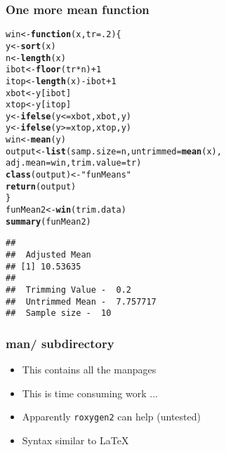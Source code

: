 \documentclass[xcolor=svgnames]{beamer}\usepackage[]{graphicx}\usepackage[]{color}
\makeatletter
\newcommand{\hlnum}[1]{\textcolor[rgb]{0.686,0.059,0.569}{#1}}%
\newcommand{\hlstr}[1]{\textcolor[rgb]{0.192,0.494,0.8}{#1}}%
\newcommand{\hlopt}[1]{\textcolor[rgb]{0,0,0}{#1}}%
\newcommand{\hlstd}[1]{\textcolor[rgb]{0.345,0.345,0.345}{#1}}%
\newcommand{\hlkwa}[1]{\textcolor[rgb]{0.161,0.373,0.58}{\textbf{#1}}}%
\newcommand{\hlkwb}[1]{\textcolor[rgb]{0.69,0.353,0.396}{#1}}%
\newcommand{\hlkwc}[1]{\textcolor[rgb]{0.333,0.667,0.333}{#1}}%
\newcommand{\hlkwd}[1]{\textcolor[rgb]{0.737,0.353,0.396}{\textbf{#1}}}%
\newenvironment{kframe}{%
 \def\at@end@of@kframe{}%
 \ifinner\ifhmode%
  \def\at@end@of@kframe{\end{minipage}}%
  \begin{minipage}{\columnwidth}%
 \fi\fi%
 \def\FrameCommand##1{\hskip\@totalleftmargin \hskip-\fboxsep
 \colorbox{shadecolor}{##1}\hskip-\fboxsep
     \hskip-\linewidth \hskip-\@totalleftmargin \hskip\columnwidth}%
 \MakeFramed {\advance\hsize-\width
   \@totalleftmargin\z@ \linewidth\hsize
   \@setminipage}}%
 {\par\unskip\endMakeFramed%
 \at@end@of@kframe}
\newenvironment{knitrout}{}{} %
\makeatother
\begin{document}
\begin{frame}[fragile]
\frametitle{One more mean function}
\begin{scriptsize}
\begin{knitrout}
\color{fgcolor}\begin{kframe}
\begin{alltt}
\hlstd{win}\hlkwb{<-}\hlkwa{function}\hlstd{(}\hlkwc{x}\hlstd{,}\hlkwc{tr}\hlstd{=}\hlnum{.2}\hlstd{)\{}
   \hlstd{y}\hlkwb{<-}\hlkwd{sort}\hlstd{(x)}
   \hlstd{n}\hlkwb{<-}\hlkwd{length}\hlstd{(x)}
   \hlstd{ibot}\hlkwb{<-}\hlkwd{floor}\hlstd{(tr}\hlopt{*}\hlstd{n)}\hlopt{+}\hlnum{1}
   \hlstd{itop}\hlkwb{<-}\hlkwd{length}\hlstd{(x)}\hlopt{-}\hlstd{ibot}\hlopt{+}\hlnum{1}
   \hlstd{xbot}\hlkwb{<-}\hlstd{y[ibot]}
   \hlstd{xtop}\hlkwb{<-}\hlstd{y[itop]}
   \hlstd{y}\hlkwb{<-}\hlkwd{ifelse}\hlstd{(y}\hlopt{<=}\hlstd{xbot,xbot,y)}
   \hlstd{y}\hlkwb{<-}\hlkwd{ifelse}\hlstd{(y}\hlopt{>=}\hlstd{xtop,xtop,y)}
   \hlstd{win}\hlkwb{<-}\hlkwd{mean}\hlstd{(y)}
   \hlstd{output} \hlkwb{<-} \hlkwd{list}\hlstd{(}\hlkwc{samp.size} \hlstd{= n,} \hlkwc{untrimmed} \hlstd{=} \hlkwd{mean}\hlstd{(x),}
                  \hlkwc{adj.mean} \hlstd{= win,} \hlkwc{trim.value} \hlstd{= tr)}
    \hlkwd{class}\hlstd{(output)} \hlkwb{<-} \hlstr{"funMeans"}
    \hlkwd{return}\hlstd{(output)}
\hlstd{\}}
\hlstd{funMean2} \hlkwb{<-} \hlkwd{win}\hlstd{(trim.data)}
\hlkwd{summary}\hlstd{(funMean2)}
\end{alltt}
\begin{verbatim}
## 
##  Adjusted Mean
## [1] 10.53635
## 
##  Trimming Value -  0.2
##  Untrimmed Mean -  7.757717
##  Sample size -  10
\end{verbatim}
\end{kframe}
\end{knitrout}
\end{scriptsize}
\end{frame}

\begin{frame}
  \frametitle{man/ subdirectory}
  \begin{itemize}
  \item This contains all the manpages
  \item This is time consuming work ... 
    \item Apparently \texttt{roxygen2} can help (untested)
      \item Syntax similar to \LaTeX
  \end{itemize}
  
\end{frame}
\end{document}
